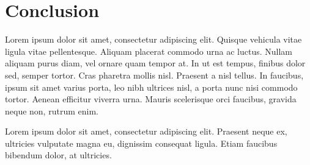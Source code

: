 \documentclass{ltjarticle}
\begin{document}

\section{Conclusion}

Lorem ipsum dolor sit amet, consectetur adipiscing elit. Quisque vehicula vitae ligula vitae pellentesque. Aliquam placerat commodo urna ac luctus. Nullam aliquam purus diam, vel ornare quam tempor at. In ut est tempus, finibus dolor sed, semper tortor. Cras pharetra mollis nisl. Praesent a nisl tellus. In faucibus, ipsum sit amet varius porta, leo nibh ultrices nisl, a porta nunc nisi commodo tortor. Aenean efficitur viverra urna. Mauris scelerisque orci faucibus, gravida neque non, rutrum enim.

Lorem ipsum dolor sit amet, consectetur adipiscing elit. Praesent neque ex, ultricies vulputate magna eu, dignissim consequat ligula. Etiam faucibus bibendum dolor, at ultricies. 





\printbibliography
\end{document}

